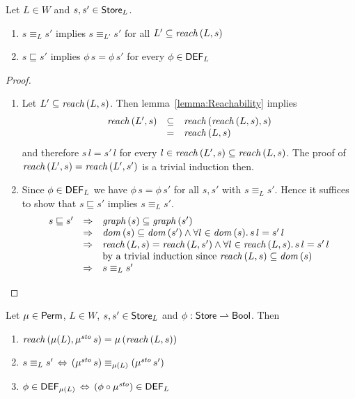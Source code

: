 \documentclass[12pt,a4paper]{report}
\newcommand{\ssto}{\nstyle{sto}}
\newcommand{\DEF}{\sstyle{DEF}}
\begin{document}
\begin{lemma} \label{lemma:L_equivalence_and_L_definability}
  Let $L \in W$ and $s,s' \in \mathsf{Store}_L$.
  \begin{enumerate}
    \item $s \equiv_{L} s'$ implies $s \equiv_{L'} s'$ for all $L' \subseteq \mathit{reach}\,(L,s)$
    \item $s \sqsubseteq s'$ implies $\phi\,s = \phi\,s'$ for every $\phi \in \DEF_L$
  \end{enumerate}
\end{lemma}

\begin{proof} \
  \begin{enumerate}
    \item Let $L' \subseteq \mathit{reach}\,(L,s)$. Then lemma~\ref{lemma:Reachability} implies
          \[\begin{array}{rcl}
            \mathit{reach}\,(L',s) &\subseteq& \mathit{reach}\,(\mathit{reach}\,(L,s),s) \\
                          &=&         \mathit{reach}\,(L,s)
          \end{array}\]
          and therefore $s\,l = s'\,l$ for every $l \in \mathit{reach}\,(L',s) \subseteq \mathit{reach}\,(L,s)$. The
          proof of $\mathit{reach}\,(L',s) = \mathit{reach}\,(L',s')$ is a trivial induction then.

    \item Since $\phi \in \DEF_L$ we have $\phi\,s = \phi\,s'$ for all $s,s'$ with $s \equiv_L s'$. Hence
          it suffices to show that $s \sqsubseteq s'$ implies $s \equiv_L s'$.
          \[\begin{array}{rcl}
            s \sqsubseteq s'
            &\Rightarrow& \mathit{graph}\,(s) \subseteq \mathit{graph}\,(s') \\
            &\Rightarrow& \mathit{dom}\,(s) \subseteq \mathit{dom}\,(s') \wedge \forall l\in\mathit{dom}\,(s).\,s\,l = s'\,l \\
            &\Rightarrow& \mathit{reach}\,(L,s) = \mathit{reach}\,(L,s') \wedge \forall l\in\mathit{reach}\,(L,s).\,s\,l = s'\,l \\
            &           & \text{by a trivial induction since $\mathit{reach}\,(L,s) \subseteq \mathit{dom}\,(s)$} \\
            &\Rightarrow& s \equiv_L s'
          \end{array}\]
  \end{enumerate}
\end{proof}

\begin{lemma} \label{lemma:Permutations_and_Reachability}
  Let $\mu \in \mathsf{Perm}$, $L \in W$, $s,s'\in\mathsf{Store}_L$ and $\phi:\mathsf{Store}\rightharpoonup\mathsf{Bool}$.
  Then
  \begin{enumerate}
    \item $\reach{\mu(L)}{\mu^\ssto\,s} = \mu\,(\reach{L}{s})$
    \item $s \equiv_L s' \,\Leftrightarrow\, (\mu^\ssto\,s) \equiv_{\mu(L)} (\mu^\ssto\,s')$
    \item $\phi \in \DEF_{\mu(L)} \,\Leftrightarrow\, (\phi \circ \mu^\ssto) \in \DEF_L$
  \end{enumerate}
\end{lemma}
\end{document}
